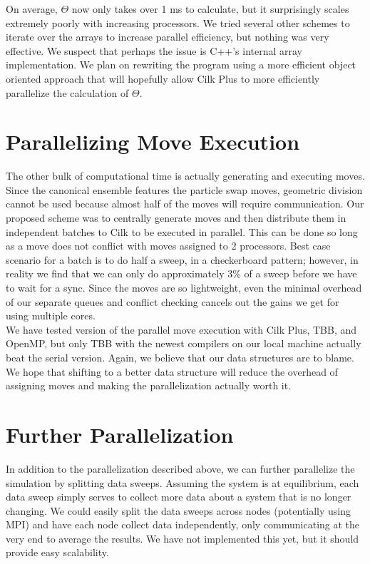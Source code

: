 \documentclass{article}
\begin{document}
\indent On average, $\Theta$ now only takes over 1 ms to calculate, but it surprisingly scales extremely poorly with increasing processors. We tried several other schemes to iterate over the arrays to increase parallel efficiency, but nothing was very effective. We suspect that perhaps the issue is C++'s internal array implementation. We plan on rewriting the program using a more efficient object oriented approach that will hopefully allow Cilk Plus to more efficiently parallelize the calculation of $\Theta$.

\section*{Parallelizing Move Execution}
\vspace{-7pt}
\indent\indent The other bulk of computational time is actually generating and executing moves. Since the canonical ensemble features the particle swap moves, geometric division cannot be used because almost half of the moves will require communication. Our proposed scheme was to centrally generate moves and then distribute them in independent batches to Cilk to be executed in parallel. This can be done so long as a move does not conflict with moves assigned to 2 processors. Best case scenario for a batch is to do half a sweep, in a checkerboard pattern; however, in reality we find that we can only do approximately 3\% of a sweep before we have to wait for a sync. Since the moves are so lightweight, even the minimal overhead of our separate queues and conflict checking cancels out the gains we get for using multiple cores.\\
\indent We have tested version of the parallel move execution with Cilk Plus, TBB, and OpenMP, but only TBB with the newest compilers on our local machine actually beat the serial version. Again, we believe that our data structures are to blame. We hope that shifting to a better data structure will reduce the overhead of assigning moves and making the parallelization actually worth it.

\section*{Further Parallelization}
\vspace{-7pt}
\indent\indent In addition to the parallelization described above, we can further parallelize the simulation by splitting data sweeps. Assuming the system is at equilibrium, each data sweep simply serves to collect more data about a system that is no longer changing. We could easily split the data sweeps across nodes (potentially using MPI) and have each node collect data independently, only communicating at the very end to average the results. We have not implemented this yet, but it should provide easy scalability.
\end{document}
